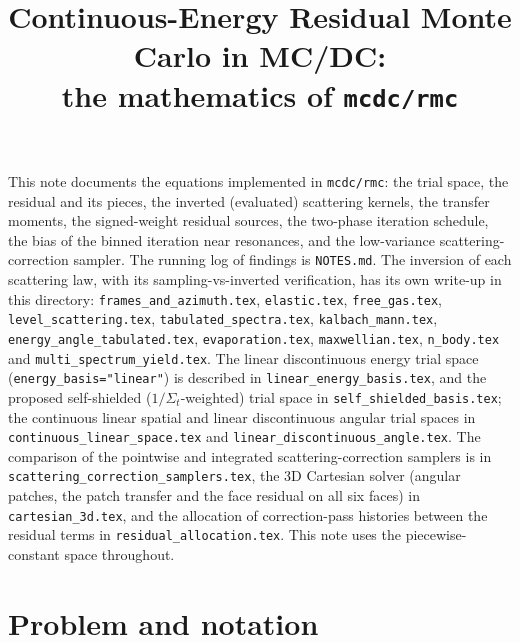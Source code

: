 \documentclass[11pt]{article}
\title{Continuous-Energy Residual Monte Carlo in MC/DC:\\
the mathematics of \texttt{mcdc/rmc}}
\date{}
\begin{document}
\maketitle

\noindent This note documents the equations implemented in \texttt{mcdc/rmc}: the
trial space, the residual and its pieces, the inverted (evaluated) scattering kernels,
the transfer moments, the signed-weight residual sources, the two-phase iteration
schedule, the bias of the binned iteration near resonances, and the low-variance
scattering-correction sampler. The running log of findings is \texttt{NOTES.md}.
The inversion of each scattering law, with its sampling-vs-inverted verification, has
its own write-up in this directory: \texttt{frames\_and\_azimuth.tex},
\texttt{elastic.tex}, \texttt{free\_gas.tex}, \texttt{level\_scattering.tex},
\texttt{tabulated\_spectra.tex}, \texttt{kalbach\_mann.tex},
\texttt{energy\_angle\_tabulated.tex}, \texttt{evaporation.tex},
\texttt{maxwellian.tex}, \texttt{n\_body.tex} and \texttt{multi\_spectrum\_yield.tex}.
The linear discontinuous energy trial space (\texttt{energy\_basis="linear"}) is
described in \texttt{linear\_energy\_basis.tex}, and the proposed self-shielded
($1/\Sigma_t$-weighted) trial space in \texttt{self\_shielded\_basis.tex}; the
continuous linear spatial and linear discontinuous angular trial spaces in
\texttt{continuous\_linear\_space.tex} and \texttt{linear\_discontinuous\_angle.tex}.
The comparison of the pointwise and integrated scattering-correction samplers is in
\texttt{scattering\_correction\_samplers.tex}, the 3D Cartesian solver (angular
patches, the patch transfer and the face residual on all six faces) in
\texttt{cartesian\_3d.tex}, and the allocation of correction-pass histories between
the residual terms in \texttt{residual\_allocation.tex}.
This note uses the piecewise-constant space throughout.

\tableofcontents

\section{Problem and notation}
\end{document}
